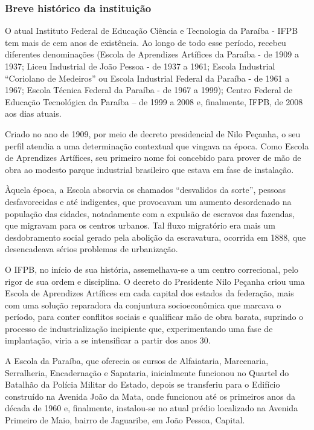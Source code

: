 \subsubsection{Breve histórico da instituição}

O atual Instituto Federal de Educação Ciência e Tecnologia da Paraíba - IFPB tem mais de cem anos de existência. Ao longo de todo esse período, recebeu diferentes denominações (Escola de Aprendizes Artífices da Paraíba - de 1909 a 1937; Liceu Industrial de João Pessoa - de 1937 a 1961; Escola Industrial ``Coriolano de Medeiros'' ou Escola Industrial Federal da Paraíba - de 1961 a 1967; Escola Técnica Federal da Paraíba - de 1967 a 1999); Centro Federal de Educação Tecnológica da Paraíba – de 1999 a 2008 e, finalmente, IFPB, de 2008 aos dias atuais.

Criado no ano de 1909, por meio de decreto presidencial de Nilo Peçanha, o seu perfil atendia a uma determinação contextual que vingava na época. Como Escola de Aprendizes Artífices, seu primeiro nome foi concebido para prover de mão de obra ao modesto parque industrial brasileiro que estava em fase de instalação.

Àquela época, a Escola absorvia os chamados ``desvalidos da sorte'', pessoas desfavorecidas e até indigentes, que provocavam um aumento desordenado na população das cidades, notadamente com a expulsão de escravos das fazendas, que migravam para os centros urbanos. Tal fluxo migratório era mais um desdobramento social gerado pela abolição da escravatura, ocorrida em 1888, que desencadeava sérios problemas de urbanização.

O IFPB, no início de sua história, assemelhava-se a um centro correcional, pelo rigor de sua ordem e disciplina. O decreto do Presidente Nilo Peçanha criou uma Escola de Aprendizes Artífices em cada capital dos estados da federação, mais com uma solução reparadora da conjuntura socioeconômica que marcava o período, para conter conflitos sociais e qualificar mão de obra barata, suprindo o processo de industrialização incipiente que, experimentando uma fase de implantação, viria a se intensificar a partir dos anos 30.

A Escola da Paraíba, que oferecia os cursos de Alfaiataria, Marcenaria, Serralheria, Encadernação e Sapataria, inicialmente funcionou no Quartel do Batalhão da Polícia Militar do Estado, depois se transferiu para o Edifício construído na Avenida João da Mata, onde funcionou até os primeiros anos da década de 1960 e, finalmente, instalou-se no atual prédio localizado na Avenida Primeiro de Maio, bairro de Jaguaribe, em João Pessoa, Capital.

